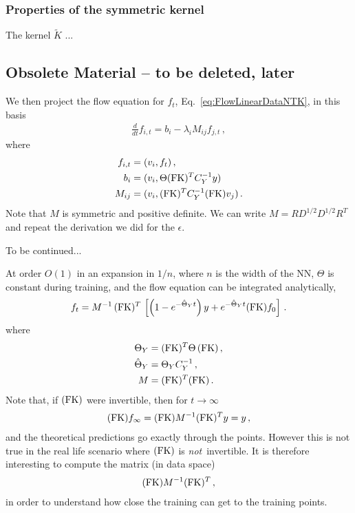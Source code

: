 \documentclass[11pt]{article}
\begin{document}
\subsubsection*{Properties of the symmetric kernel}
The kernel $\tilde{K}$ ...



\newpage
\subsection*{Obsolete Material -- to be deleted, later}

We then project the flow equation for $f_t$, Eq.~\ref{eq:FlowLinearDataNTK}, in this basis
\begin{align}
    \label{eq:FlowEigenbasisNTK}
    \frac{d}{dt} f_{i,t} = b_i - \lambda_i M_{ij} f_{j,t}\, ,
\end{align} 
where
\begin{align}
    f_{i,t} &= (v_i, f_t)\, , \\
    b_i &= (v_i, \Theta (\mathrm{FK})^T C_Y^{-1} y)\, \\
    M_{ij} &= (v_i, (\mathrm{FK})^T C_Y^{-1} (\mathrm{FK}) v_j)\, .
\end{align}
Note that $M$ is symmetric and positive definite. We can write $M = R D^{1/2} D^{1/2} R^T$ and repeat the 
derivation we did for the $\epsilon$.

To be continued... 

At order $O(1)$ in an expansion in $1/n$, where $n$ is the width of the NN, $\Theta$ is constant during training, and the flow equation can be integrated analytically, 
\begin{align}
    \label{eq:IntegrateFlowAtLeadingOrder}
    f_t = M^{-1}\, (\mathrm{FK})^T\, \left[
        \left(1 - e^{-\hat{\Theta}_Yt}\right) y +
        e^{-\hat{\Theta}_Y t} (\mathrm{FK}) f_0
    \right]\, .
\end{align}
where 
\begin{align}
    \label{eq:DefineThetaM}
    \Theta_Y &= (\mathrm{FK})^T \Theta\, (\mathrm{FK})\, , \\
    \hat{\Theta}_Y &= \Theta_Y C_Y^{-1}\, , \\    
    M &=  (\mathrm{FK})^T (\mathrm{FK})\, .
\end{align}
Note that, if $(\mathrm{FK})$ were invertible, then for $t\to\infty$
\begin{align}
    (\mathrm{FK}) f_\infty = (\mathrm{FK}) M^{-1} (\mathrm{FK})^T y = y\, ,
\end{align}
and the theoretical predictions go exactly through the points. However this is not true in the real life scenario where $(\mathrm{FK})$ is {\em not}\ invertible. It is therefore interesting to compute the matrix (in data space)
\begin{align}
    (\mathrm{FK}) M^{-1} (\mathrm{FK})^T \, ,    
\end{align}
in order to understand how close the training can get to the training points. 
\end{document}
